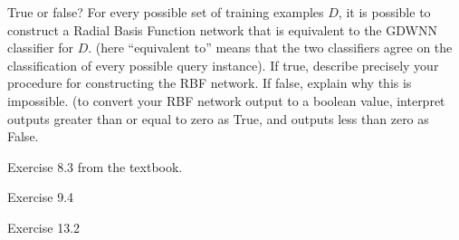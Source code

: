 True or false? For every possible set of training examples $D$, it is possible
to construct a Radial Basis Function network that is equivalent to the GDWNN
classifier for $D$.  (here ``equivalent to'' means that the two classifiers
agree on the classification of every possible query instance).  If true,
describe precisely your procedure for constructing the RBF network.  If false,
explain why this is impossible.  (to convert your RBF network output to a
boolean value, interpret outputs greater than or equal to zero as True, and
outputs less than zero as False.
\item Exercise 8.3 from the textbook.
\item Exercise 9.4
\item Exercise 13.2
\ee


